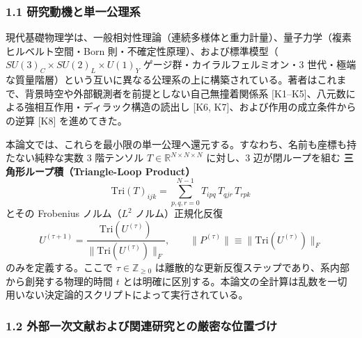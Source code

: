 \documentclass[
  a4paper,
]{ltjsarticle}
\begin{document}
\subsubsection{1.1
研究動機と単一公理系}\label{ux7814ux7a76ux52d5ux6a5fux3068ux5358ux4e00ux516cux7406ux7cfb}

現代基礎物理学は、一般相対性理論（連続多様体と重力計量）、量子力学（複素ヒルベルト空間・Born
則・不確定性原理）、および標準模型（\(SU(3)_C \times SU(2)_L \times U(1)_Y\)
ゲージ群・カイラルフェルミオン・3
世代・極端な質量階層）という互いに異なる公理系の上に構築されている。著者はこれまで、背景時空や外部観測者を前提としない自己無撞着関係系
{[}K1--K5{]}、八元数による強相互作用・ディラック構造の読出し {[}K6,
K7{]}、および作用の成立条件からの逆算 {[}K8{]} を進めてきた。

本論文では、これらを最小限の単一公理へ還元する。すなわち、名前も座標も持たない純粋な実数
3 階テンソル \(T \in \mathbb{R}^{N\times N\times N}\) に対し、3
辺が閉ループを組む \textbf{三角形ループ積（Triangle-Loop Product）}
\[\mathrm{Tri}(T)_{ijk} = \sum_{p,q,r=0}^{N-1} T_{ipq}\, T_{qjr}\, T_{rpk} \tag{1}\]
とその Frobenius ノルム（\(L^2\) ノルム）正規化反復
\[U^{(\tau+1)} = \frac{\mathrm{Tri}(U^{(\tau)})}{\|\mathrm{Tri}(U^{(\tau)})\|_F}, \qquad \|P^{(\tau)}\| \equiv \|\mathrm{Tri}(U^{(\tau)})\|_F \tag{2}\]
のみを定義する。ここで \(\tau \in \mathbb{Z}_{\ge 0}\)
は離散的な更新反復ステップであり、系内部から創発する物理的時間 \(t\)
とは明確に区別する。本論文の全計算は乱数を一切用いない決定論的スクリプトによって実行されている。

\subsubsection{1.2
外部一次文献および関連研究との厳密な位置づけ}\label{ux5916ux90e8ux4e00ux6b21ux6587ux732eux304aux3088ux3073ux95a2ux9023ux7814ux7a76ux3068ux306eux53b3ux5bc6ux306aux4f4dux7f6eux3065ux3051}
\end{document}
